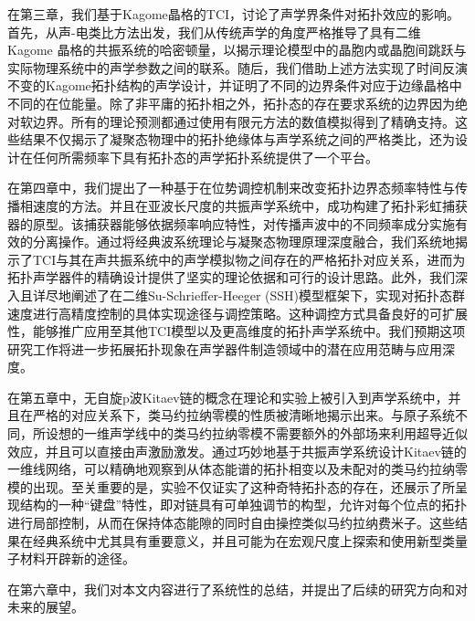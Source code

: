 在第三章，我们基于Kagome晶格的TCI，讨论了声学界条件对拓扑效应的影响。首先，从声-电类比方法出发，我们从传统声学的角度严格推导了具有二维 Kagome 晶格的共振系统的哈密顿量，以揭示理论模型中的晶胞内或晶胞间跳跃与实际物理系统中的声学参数之间的联系。随后，我们借助上述方法实现了时间反演不变的Kagome拓扑结构的声学设计，并证明了不同的边界条件对应于边缘晶格中不同的在位能量。除了非平庸的拓扑相之外，拓扑态的存在要求系统的边界因为绝对软边界。所有的理论预测都通过使用有限元方法的数值模拟得到了精确支持。这些结果不仅揭示了凝聚态物理中的拓扑绝缘体与声学系统之间的严格类比，还为设计在任何所需频率下具有拓扑态的声学拓扑系统提供了一个平台。

在第四章中，我们提出了一种基于在位势调控机制来改变拓扑边界态频率特性与传播相速度的方法。并且在亚波长尺度的共振声学系统中，成功构建了拓扑彩虹捕获器的原型。该捕获器能够依据频率响应特性，对传播声波中的不同频率成分实施有效的分离操作。通过将经典波系统理论与凝聚态物理原理深度融合，我们系统地揭示了TCI与其在声共振系统中的声学模拟物之间存在的严格拓扑对应关系，进而为拓扑声学器件的精确设计提供了坚实的理论依据和可行的设计思路。此外，我们深入且详尽地阐述了在二维Su-Schrieffer-Heeger (SSH)模型框架下，实现对拓扑态群速度进行高精度控制的具体实现途径与调控策略。这种调控方式具备良好的可扩展性，能够推广应用至其他TCI模型以及更高维度的拓扑声学系统中。我们预期这项研究工作将进一步拓展拓扑现象在声学器件制造领域中的潜在应用范畴与应用深度。 

在第五章中，无自旋p波Kitaev链的概念在理论和实验上被引入到声学系统中，并且在严格的对应关系下，类马约拉纳零模的性质被清晰地揭示出来。与原子系统不同，所设想的一维声学线中的类马约拉纳零模不需要额外的外部场来利用超导近似效应，并且可以直接由声激励激发。通过巧妙地基于共振声学系统设计Kitaev链的一维线网络，可以精确地观察到从体态能谱的拓扑相变以及未配对的类马约拉纳零模的出现。至关重要的是，实验不仅证实了这种奇特拓扑态的存在，还展示了所呈现结构的一种“键盘”特性，即对链具有可单独调节的构型，允许对每个位点的拓扑进行局部控制，从而在保持体态能隙的同时自由操控类似马约拉纳费米子。这些结果在经典系统中尤其具有重要意义，并且可能为在宏观尺度上探索和使用新型类量子材料开辟新的途径。 

在第六章中，我们对本文内容进行了系统性的总结，并提出了后续的研究方向和对未来的展望。